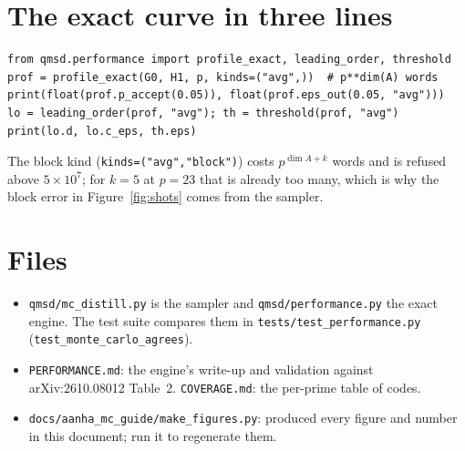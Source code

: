 \documentclass[11pt]{article}
\newcommand{\code}[1]{\texttt{#1}}
\begin{document}
\section{The exact curve in three lines}\label{app:exact}

\begin{lstlisting}
from qmsd.performance import profile_exact, leading_order, threshold
prof = profile_exact(G0, H1, p, kinds=("avg",))  # p**dim(A) words
print(float(prof.p_accept(0.05)), float(prof.eps_out(0.05, "avg")))
lo = leading_order(prof, "avg"); th = threshold(prof, "avg")
print(lo.d, lo.c_eps, th.eps)
\end{lstlisting}
The block kind (\code{kinds=("avg","block")}) costs $p^{\dim A + k}$ words and is
refused above $5\times10^{7}$; for $k=5$ at $p=23$ that is already too many, which
is why the block error in Figure~\ref{fig:shots} comes from the sampler.

\section{Files}

\begin{itemize}[nosep]
\item \code{qmsd/mc\_distill.py} is the sampler and \code{qmsd/performance.py} the
  exact engine. The test suite compares them in \code{tests/test\_performance.py}
  (\code{test\_monte\_carlo\_agrees}).
\item \code{PERFORMANCE.md}: the engine's write-up and validation against
  arXiv:2610.08012 Table~2. \code{COVERAGE.md}: the per-prime table of codes.
\item \code{docs/aanha\_mc\_guide/make\_figures.py}: produced every figure and number in
  this document; run it to regenerate them.
\end{itemize}
\end{document}
